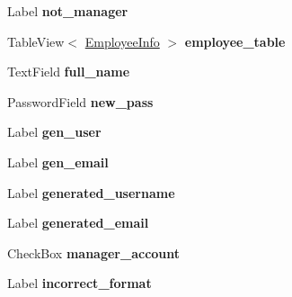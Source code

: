\begin{DoxyCompactItemize}
\mbox{\label{class_g_u_i_project_1_1_controller_aecb88a7bb21fad76f1fcdf0bf0204811}} 
Label {\bfseries not\+\_\+manager}
\item 
\mbox{\label{class_g_u_i_project_1_1_controller_acc27cf6e36ecc9b4b263ddb38bd0a5a3}} 
Table\+View$<$ \mbox{\hyperlink{class_g_u_i_project_1_1_employee_info}{Employee\+Info}} $>$ {\bfseries employee\+\_\+table}
\item 
\mbox{\label{class_g_u_i_project_1_1_controller_a9095d50aa79bbdfbd398af52e7f90bf6}} 
Text\+Field {\bfseries full\+\_\+name}
\item 
\mbox{\label{class_g_u_i_project_1_1_controller_ace6155a8d773ff9602bfc9faf83ef3c3}} 
Password\+Field {\bfseries new\+\_\+pass}
\item 
\mbox{\label{class_g_u_i_project_1_1_controller_acb2accee72ffe6a91ba682d5ea2aa1e9}} 
Label {\bfseries gen\+\_\+user}
\item 
\mbox{\label{class_g_u_i_project_1_1_controller_afc8b331bf77143f4854d6dde87a7b395}} 
Label {\bfseries gen\+\_\+email}
\item 
\mbox{\label{class_g_u_i_project_1_1_controller_a623016172063afa564c0d60a92fb4ae5}} 
Label {\bfseries generated\+\_\+username}
\item 
\mbox{\label{class_g_u_i_project_1_1_controller_a988618d924b2398f955c6791117551b7}} 
Label {\bfseries generated\+\_\+email}
\item 
\mbox{\label{class_g_u_i_project_1_1_controller_a980333d39464133054f3cb1b6d001e3e}} 
Check\+Box {\bfseries manager\+\_\+account}
\item 
\mbox{\label{class_g_u_i_project_1_1_controller_aec424679f5d00a0458f090c40290f275}} 
Label {\bfseries incorrect\+\_\+format}
\item 

\end{DoxyCompactItemize}
